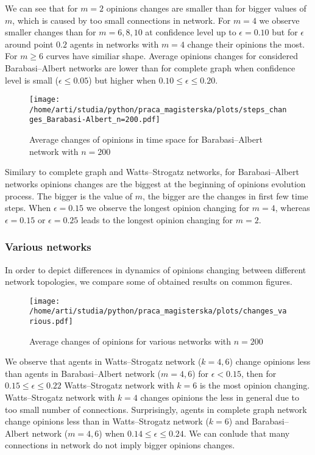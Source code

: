 \documentclass{article}
\begin{document}
We can see that for $m=2$ opinions changes are smaller than for bigger values of $m$, which is caused by too small connections in network. For $m=4$ we observe smaller changes than for $m=6,8,10$ at confidence level up to $\epsilon=0.10$ but for $\epsilon$ around point $0.2$ agents in networks with $m=4$ change their opinions the most. For $m \geq 6$ curves have similiar shape. Average opinions changes for considered Barabasi--Albert networks are lower than for complete graph when confidence level is small ($\epsilon \leq 0.05$) but higher when $0.10 \leq \epsilon \leq 0.20$.

\begin{figure}[H]
		\centering
		\texttt{[image: /home/arti/studia/python/praca\_magisterska/plots/steps\_changes\_Barabasi-Albert\_n=200.pdf]}
		\caption{Average changes of opinions in time space for Barabasi--Albert network with $n=200$}
\end{figure}

Similary to complete graph and Watts--Strogatz networks, for Barabasi--Albert networks opinions changes are the biggest at the beginning of opinions evolution process. The bigger is the value of $m$, the bigger are the changes in first few time steps. When $\epsilon=0.15$ we observe the longest opinion changing for $m=4$, whereas $\epsilon=0.15$ or $\epsilon=0.25$ leads to the longest opinion changing for $m=2$.

\subsubsection{Various networks}

In order to depict differences in dynamics of opinions changing between different network topologies, we compare some of obtained results on common figures.

\begin{figure}[H]
		\centering
		\texttt{[image: /home/arti/studia/python/praca\_magisterska/plots/changes\_various.pdf]}
		\caption{Average changes of opinions for various networks with $n=200$}
\end{figure}

We observe that agents in Watts--Strogatz network ($k=4,6$) change opinions less than agents in Barabasi--Albert network ($m=4,6$) for $\epsilon < 0.15$, then for $0.15 \leq \epsilon \leq 0.22$ Watts--Strogatz network with $k=6$ is the most opinion changing. Watts--Strogatz network with $k=4$ changes opinions the less in general due to too small number of connections. Surprisingly, agents in complete graph network change opinions less than in Watts--Strogatz network ($k=6$) and Barabasi--Albert network ($m=4,6$) when $0.14 \leq \epsilon \leq 0.24$. We can conlude that many connections in network do not imply bigger opinions changes.
\end{document}
